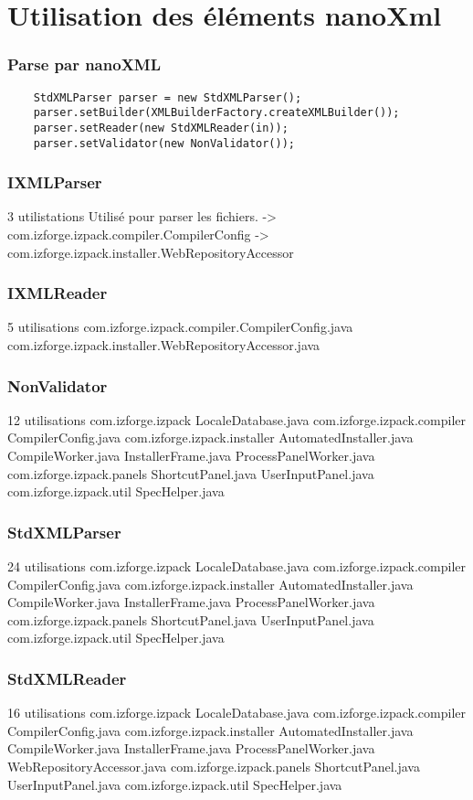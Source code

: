 \chapter{Utilisation des éléments nanoXml}

\subsection{Parse par nanoXML}
\begin{verbatim}
	StdXMLParser parser = new StdXMLParser();
	parser.setBuilder(XMLBuilderFactory.createXMLBuilder());
	parser.setReader(new StdXMLReader(in));
	parser.setValidator(new NonValidator());
\end{verbatim}
\subsection{IXMLParser}
3 utilistations
 Utilisé pour parser les fichiers.
 -> com.izforge.izpack.compiler.CompilerConfig
 -> com.izforge.izpack.installer.WebRepositoryAccessor
\subsection{IXMLReader}
5 utilisations
com.izforge.izpack.compiler.CompilerConfig.java
com.izforge.izpack.installer.WebRepositoryAccessor.java
\subsection{NonValidator}
12 utilisations
  com.izforge.izpack
    LocaleDatabase.java
  com.izforge.izpack.compiler
    CompilerConfig.java
  com.izforge.izpack.installer
    AutomatedInstaller.java
    CompileWorker.java
    InstallerFrame.java
    ProcessPanelWorker.java
  com.izforge.izpack.panels
    ShortcutPanel.java
    UserInputPanel.java
  com.izforge.izpack.util
    SpecHelper.java
\subsection{StdXMLParser}
24 utilisations
  com.izforge.izpack
    LocaleDatabase.java 
  com.izforge.izpack.compiler 
    CompilerConfig.java 
  com.izforge.izpack.installer 
    AutomatedInstaller.java 
    CompileWorker.java 
    InstallerFrame.java 
    ProcessPanelWorker.java 
  com.izforge.izpack.panels 
    ShortcutPanel.java 
    UserInputPanel.java 
  com.izforge.izpack.util 
    SpecHelper.java 
\subsection{StdXMLReader}
16 utilisations
  com.izforge.izpack 
    LocaleDatabase.java 
  com.izforge.izpack.compiler 
    CompilerConfig.java 
  com.izforge.izpack.installer 
    AutomatedInstaller.java 
    CompileWorker.java 
    InstallerFrame.java 
    ProcessPanelWorker.java 
    WebRepositoryAccessor.java 
  com.izforge.izpack.panels 
    ShortcutPanel.java 
    UserInputPanel.java 
  com.izforge.izpack.util 
    SpecHelper.java 
